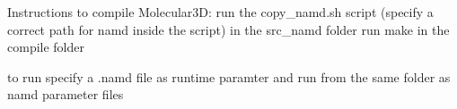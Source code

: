 Instructions to compile Molecular3D:
run the copy_namd.sh script (specify a correct path for namd inside the script) in the src_namd folder
run make in the compile folder

to run specify a .namd file as runtime paramter and run from the same folder as namd parameter files
